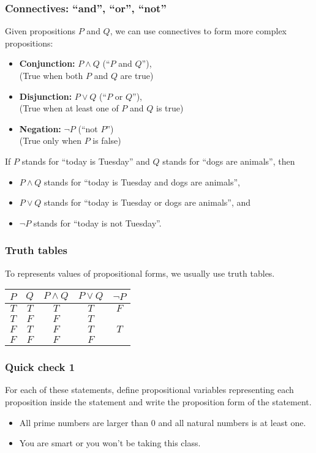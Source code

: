 \documentclass{beamer}
\begin{document}
\begin{frame}\frametitle{Connectives: ``and'', ``or'', ``not''}
  Given propositions $P$ and $Q$, we can use connectives to form more
  complex propositions:
  \begin{itemize}
  \item {\bf Conjunction:} $P\wedge Q$ (``$P$ and $Q$''), \\
    (True when both $P$ and $Q$ are true)
  \item {\bf Disjunction:} $P\vee Q$ (``$P$ or $Q$''), \\
    (True when at least one of $P$ and $Q$ is true)
  \item {\bf Negation:} $\neg P$ (``not $P$'') \\
    (True only when $P$ is false)
  \end{itemize}
  \pause

  If $P$ stands for ``today is Tuesday'' and $Q$ stands for
  ``dogs are animals'', then
  \begin{itemize}
  \item $P\wedge Q$ stands for ``today is Tuesday and dogs are animals'',
  \item $P\vee Q$ stands for ``today is Tuesday or dogs are animals'', and
  \item $\neg P$ stands for ``today is not Tuesday''.
  \end{itemize}
\end{frame}

\begin{frame}\frametitle{Truth tables}
  To represents values of propositional forms, we usually use truth tables.
  \begin{tcolorbox}[title=And/Or/Not]
    \begin{tabular}{|c|c||c|c|c|}
      \hline
      $P$ & $Q$ & $P\wedge Q$ & $P\vee Q$ & $\neg P$ \\
      \hline
      $T$ & $T$ & $T$ & $T$ & $F$ \\
      $T$ & $F$ & $F$ & $T$ & \\
      $F$ & $T$ & $F$ & $T$ & $T$ \\
      $F$ & $F$ & $F$ & $F$ & \\
      \hline
    \end{tabular}
  \end{tcolorbox}
\end{frame}

\begin{frame}\frametitle{Quick check 1}
  For each of these statements, define propositional variables
  representing each proposition inside the statement and write the
  proposition form of the statement.
  \begin{itemize}
  \item All prime numbers are larger than 0 and all natural numbers is
    at least one.
  \item You are smart or you won't be taking this class.
  \end{itemize}
\end{frame}
\end{document}
